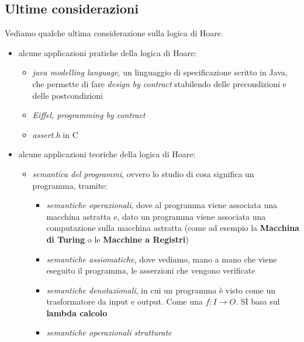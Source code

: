 				      					      			\subsection{Ultime considerazioni}
				      					      			Vediamo qualche ultima considerazione sulla logica di Hoare.
				      					      			\begin{itemize}
				      					      				\item alcune applicazioni pratiche della logica di Hoare:
				      					      				      \begin{itemize}
				      					      				      	\item \textit{java modelling language}, un linguaggio di specificazione
				      					      				      	      scritto in Java, che permette di fare \textit{design by contract} stabilendo
				      					      				      	      delle precondizioni e delle postcondizioni 
				      					      				      	\item \textit{Eiffel, programming by contract}
				      					      				      	\item \textit{assert.h} in C
				      					      				      \end{itemize}
				      					      				        
				      					      				\item alcune applicazioni teoriche della logica di Hoare:
				      					      				      \begin{itemize}
				      					      				      	\item \textit{semantica del programmi}, ovvero lo studio di cosa significa
				      					      				      	      un programma, tramite:
				      					      				      	      \begin{itemize}
				      					      				      	      	\item \textit{semantiche operazionali}, dove al programma
				      					      				      	      	      viene associata una macchina astratta e, dato un programma viene associata
				      					      				      	      	      una computazione sulla macchina astratta (come ad esempio la
				      					      				      	      	      \textbf{Macchina di Turing} o le \textbf{Macchine a Registri})
				      					      				      	      	\item \textit{semantiche assiomatiche}, dove vediamo, mano a mano che
				      					      				      	      	      viene eseguito il programma, le asserzioni che vengono verificate
				      					      				      	      	\item \textit{semantiche denotazionali}, in cui un programma è visto come
				      					      				      	      	      un trasformatore da input e output. Come una $f:I\to O$. SI basa sul
				      					      				      	      	      \textbf{lambda calcolo}
				      					      				      	      	\item \textit{semantiche operazionali strutturate}
				      					      				      	      \end{itemize}
				      					      				      \end{itemize}
				      					      			\end{itemize}
